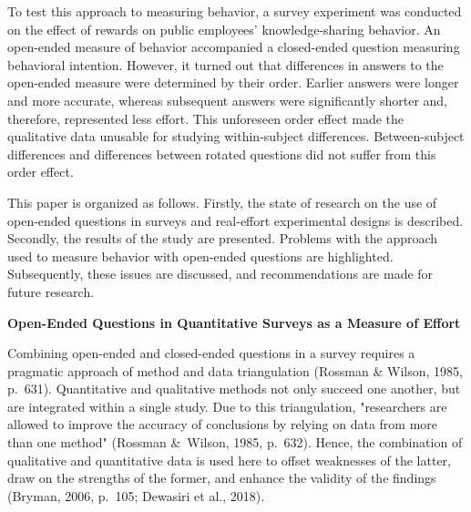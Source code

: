 \documentclass{article}
\begin{document}
To test this approach to measuring behavior, a survey experiment was conducted on the effect of rewards on public employees' knowledge-sharing behavior. An open-ended measure of behavior accompanied a closed-ended question measuring behavioral intention. However, it turned out that differences in answers to the open-ended measure were determined by their order. Earlier answers were longer and more accurate, whereas subsequent answers were significantly shorter and, therefore, represented less effort. This unforeseen order effect made the qualitative data unusable for studying within-subject differences. Between-subject differences and differences between rotated questions did not suffer from this order effect. 

This paper is organized as follows. Firstly, the state of research on the use of open-ended questions in surveys and real-effort experimental designs is described. Secondly, the results of the study are presented. Problems with the approach used to measure behavior with open-ended questions are highlighted. Subsequently, these issues are discussed, and recommendations are made for future research. 

\textbf{Open-Ended Questions in Quantitative Surveys as a Measure of Effort }

Combining open-ended and closed-ended questions in a survey requires a pragmatic approach of method and data triangulation (Rossman \& Wilson, 1985, p. 631). Quantitative and qualitative methods not only succeed one another, but are integrated within a single study. Due to this triangulation, "researchers are allowed to improve the accuracy of conclusions by relying on data from more than one method" (Rossman \& Wilson, 1985, p. 632). Hence, the combination of qualitative and quantitative data is used here to offset weaknesses of the latter, draw on the strengths of the former, and enhance the validity of the findings (Bryman, 2006, p. 105; Dewasiri et al., 2018).
\end{document}
